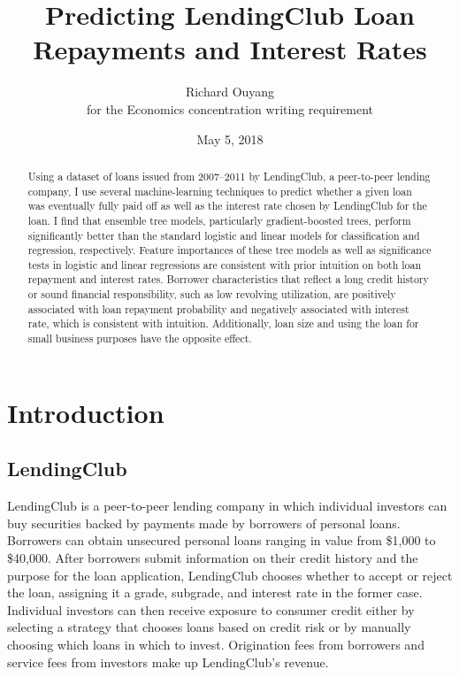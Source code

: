 \documentclass[12pt]{article}
\title{Predicting LendingClub Loan Repayments and Interest Rates}
\author{Richard Ouyang\\{\small for the Economics concentration writing requirement}}
\date{May 5, 2018}
\begin{document}
\maketitle

\begin{abstract}
Using a dataset of loans issued from 2007--2011 by LendingClub, a peer-to-peer lending company, I use several machine-learning techniques to predict whether a given loan was eventually fully paid off as well as the interest rate chosen by LendingClub for the loan. I find that ensemble tree models, particularly gradient-boosted trees, perform significantly better than the standard logistic and linear models for classification and regression, respectively. Feature importances of these tree models as well as significance tests in logistic and linear regressions are consistent with prior intuition on both loan repayment and interest rates. Borrower characteristics that reflect a long credit history or sound financial responsibility, such as low revolving utilization, are positively associated with loan repayment probability and negatively associated with interest rate, which is consistent with intuition. Additionally, loan size and using the loan for small business purposes have the opposite effect.
\end{abstract}

\newpage
\tableofcontents

\newpage
\section{Introduction}

\subsection{LendingClub}

LendingClub \cite{lendingclub} is a peer-to-peer lending company in which individual investors can buy securities backed by payments made by borrowers of personal loans. Borrowers can obtain unsecured personal loans ranging in value from \$1,000 to \$40,000. After borrowers submit information on their credit history and the purpose for the loan application, LendingClub chooses whether to accept or reject the loan, assigning it a grade, subgrade, and interest rate in the former case. Individual investors can then receive exposure to consumer credit either by selecting a strategy that chooses loans based on credit risk or by manually choosing which loans in which to invest. Origination fees from borrowers and service fees from investors make up LendingClub's revenue.
\end{document}

